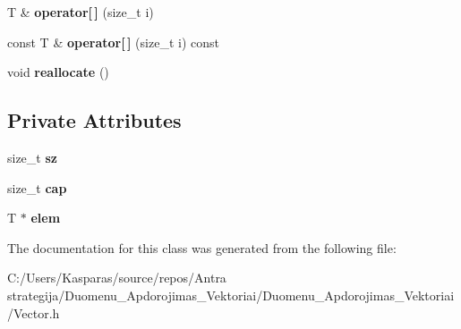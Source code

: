 \begin{DoxyCompactItemize}
\item 
\mbox{\label{class_vector_a620f40593577792b4fa9546da39eb9da}} 
T \& {\bfseries operator\mbox{[}$\,$\mbox{]}} (size\+\_\+t i)
\item 
\mbox{\label{class_vector_ac67f5e22236ad36ff9db3a4580606ac9}} 
const T \& {\bfseries operator\mbox{[}$\,$\mbox{]}} (size\+\_\+t i) const
\item 
\mbox{\label{class_vector_adc4d93383895f3f88fad1fcc256c765e}} 
void {\bfseries reallocate} ()
\end{DoxyCompactItemize}
\subsection*{Private Attributes}
\begin{DoxyCompactItemize}
\item 
\mbox{\label{class_vector_a0fd3434801c6378fdb12167bbfc61614}} 
size\+\_\+t {\bfseries sz}
\item 
\mbox{\label{class_vector_a97ce6d975ed9e9ee81592b0778bee266}} 
size\+\_\+t {\bfseries cap}
\item 
\mbox{\label{class_vector_afce0f84380ff2c719e955fd3baa2b4fe}} 
T $\ast$ {\bfseries elem}
\end{DoxyCompactItemize}


The documentation for this class was generated from the following file\+:\begin{DoxyCompactItemize}
\item 
C\+:/\+Users/\+Kasparas/source/repos/\+Antra strategija/\+Duomenu\+\_\+\+Apdorojimas\+\_\+\+Vektoriai/\+Duomenu\+\_\+\+Apdorojimas\+\_\+\+Vektoriai/Vector.\+h\end{DoxyCompactItemize}
